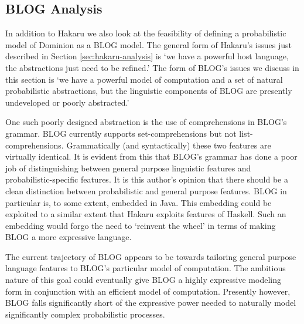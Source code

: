 \subsection{BLOG Analysis} \label{sec:blog-analysis}

In addition to Hakaru we also look at the feasibility of defining a
probabilistic model of Dominion as a BLOG model. The general form
of Hakaru's issues just described in Section \ref{sec:hakaru-analysis}
is `we have a powerful host language, the abstractions
just need to be refined.' The form of BLOG's issues we discuss in this
section is `we have a powerful model of computation and a set of
natural probabilistic abstractions, but the linguistic components
of BLOG are presently undeveloped or poorly abstracted.'

One such poorly designed abstraction is the use of comprehensions
in BLOG's grammar. BLOG currently supports set-comprehensions
but not list-comprehensions. Grammatically (and syntactically) these
two features are virtually identical.
It is evident from this that BLOG's grammar has done a poor job of
distinguishing between general purpose linguistic features and
probabilistic-specific features. It is this author's opinion that
there should be a clean distinction between probabilistic and
general purpose features. BLOG in particular is, to some extent, embedded
in Java. This embedding could be exploited to a similar extent that
Hakaru exploits features of Haskell. Such an embedding would forgo the
need to `reinvent the wheel' in terms of making BLOG a more expressive
language.

The current trajectory of BLOG appears to be towards tailoring
general purpose language features to BLOG's particular model of computation.
The ambitious nature of this goal could eventually give BLOG a highly
expressive modeling form in conjunction with an efficient model of
computation. Presently however, BLOG falls significantly short of the
expressive power needed to naturally model significantly complex
probabilistic processes.


